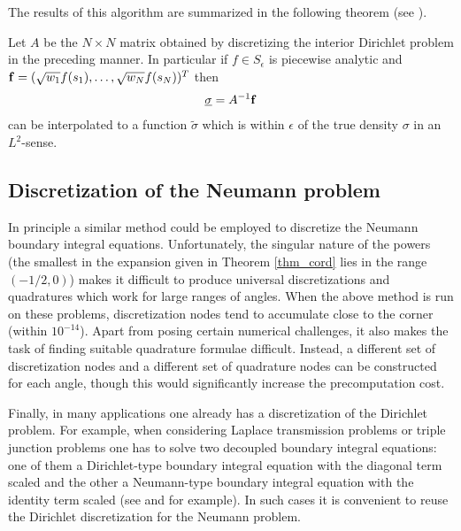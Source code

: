 The results of this algorithm are summarized in the following theorem (see \cite{}).
\begin{theorem}
Let $A$ be the $N\times N$ matrix obtained by discretizing the interior Dirichlet problem in the preceding manner. In particular if $f \in S_\epsilon $ is piecewise analytic and ${\bf f} = (\sqrt{w_1}f(s_1),\dots,\sqrt{w_N}f(s_N))^T$ then
\begin{align}
\underline{\bf \sigma} = A^{-1} {\bf f}
\end{align}
can be interpolated to a function $\tilde{\sigma}$ which is within $\epsilon$ of the true density $\sigma$ in an $L^2$-sense. 
\end{theorem}


\subsection{Discretization of the Neumann problem}
In principle a similar method could be employed to discretize the Neumann boundary integral equations. Unfortunately, the singular nature of the powers (the smallest in the expansion given in Theorem \ref{thm_cord} lies in the range $(-1/2,0)$) makes it difficult to produce universal discretizations and quadratures which work for large ranges of angles. When the above method is run on these problems, discretization nodes tend to accumulate close to the corner (within $10^{-14}$). Apart from posing certain numerical challenges, it also makes the task of finding suitable quadrature formulae difficult. Instead, a different set of discretization nodes and a different set of quadrature nodes can be constructed for each angle, though this would significantly increase the precomputation cost.

Finally, in many applications one already has a discretization of the Dirichlet problem. For example, when considering Laplace transmission problems or triple junction problems one has to solve two decoupled boundary integral equations: one of them a Dirichlet-type boundary integral equation with the diagonal term scaled and the other a Neumann-type boundary integral equation with the identity term scaled (see \cite{} and \cite{} for example). In such cases it is convenient to reuse the Dirichlet discretization for the Neumann problem.  

